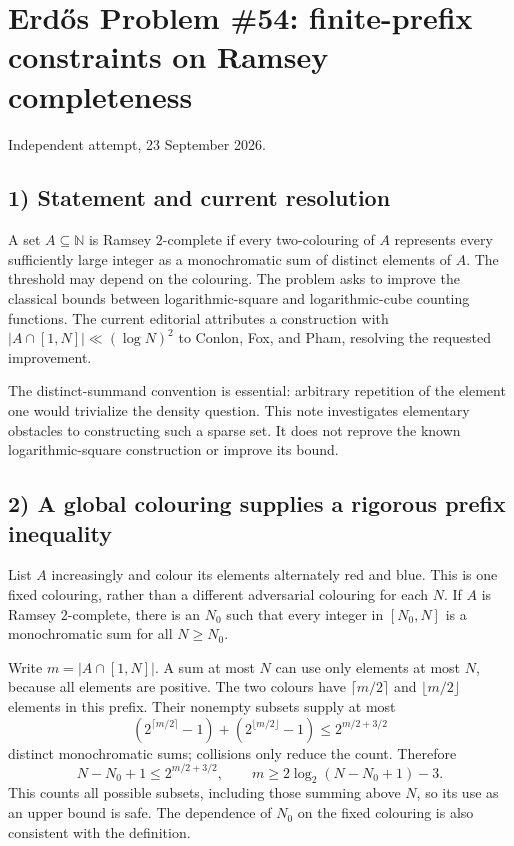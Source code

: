 \section{Erd\H{o}s Problem \#54: finite-prefix constraints on Ramsey completeness}
\noindent Independent attempt, 23 September 2026.

\subsection*{1) Statement and current resolution}
A set $A\subseteq\mathbb N$ is Ramsey $2$-complete if every two-colouring of $A$ represents every sufficiently large integer as a monochromatic sum of distinct elements of $A$. The threshold may depend on the colouring. The problem asks to improve the classical bounds between logarithmic-square and logarithmic-cube counting functions. The current editorial attributes a construction with $|A\cap[1,N]|\ll(\log N)^2$ to Conlon, Fox, and Pham, resolving the requested improvement.

The distinct-summand convention is essential: arbitrary repetition of the element one would trivialize the density question. This note investigates elementary obstacles to constructing such a sparse set. It does not reprove the known logarithmic-square construction or improve its bound.

\subsection*{2) A global colouring supplies a rigorous prefix inequality}
List $A$ increasingly and colour its elements alternately red and blue. This is one fixed colouring, rather than a different adversarial colouring for each $N$. If $A$ is Ramsey $2$-complete, there is an $N_0$ such that every integer in $[N_0,N]$ is a monochromatic sum for all $N\ge N_0$.

Write $m=|A\cap[1,N]|$. A sum at most $N$ can use only elements at most $N$, because all elements are positive. The two colours have $\lceil m/2\rceil$ and $\lfloor m/2\rfloor$ elements in this prefix. Their nonempty subsets supply at most
\[
 (2^{\lceil m/2\rceil}-1)+(2^{\lfloor m/2\rfloor}-1)
 \le2^{m/2+3/2}
\]
distinct monochromatic sums; collisions only reduce the count. Therefore
\[
 N-N_0+1\le2^{m/2+3/2},\qquad
 m\ge2\log_2(N-N_0+1)-3.\tag{1}
\]
This counts all possible subsets, including those summing above $N$, so its use as an upper bound is safe. The dependence of $N_0$ on the fixed colouring is also consistent with the definition.

